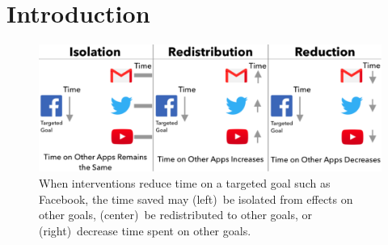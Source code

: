 \section{Introduction}








\begin{figure}[tb]

\includegraphics[width=\linewidth, clip,trim=0 0 0.1 0]{figures2/intro/fig1v4.pdf}
\caption{When interventions reduce time on a targeted goal such as Facebook, the time saved may (left)~be isolated from effects on other goals, (center)~be redistributed to other goals, or (right)~decrease time spent on other goals.
} %

  \label{fig:hypotheses-within}
\end{figure}

